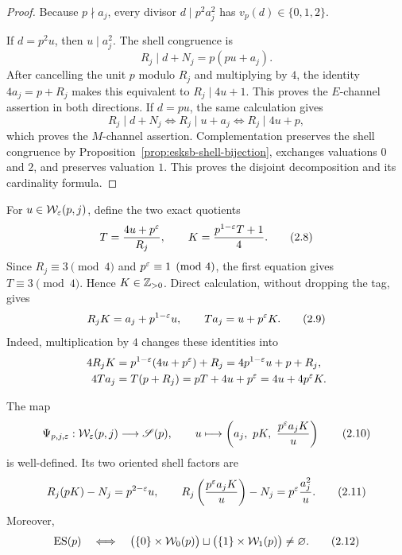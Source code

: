 \begin{proof}
Because \(p\nmid a_j\), every divisor \(d\mid p^2a_j^2\) has
\(v_p(d)\in\{0,1,2\}\).

If \(d=p^2u\), then \(u\mid a_j^2\).  The shell congruence is
\[
 R_j\mid d+N_j=p(pu+a_j).
\]
After cancelling the unit \(p\) modulo \(R_j\) and multiplying by \(4\),
the identity \(4a_j=p+R_j\) makes this equivalent to
\(R_j\mid4u+1\).  This proves the \(E\)-channel assertion in both
directions.  If \(d=pu\), the same calculation gives
\[
 R_j\mid d+N_j
 \Longleftrightarrow R_j\mid u+a_j
 \Longleftrightarrow R_j\mid4u+p,
\]
which proves the \(M\)-channel assertion.  Complementation preserves the
shell congruence by Proposition~\ref{prop:esksb-shell-bijection}, exchanges
valuations \(0\) and \(2\), and preserves valuation \(1\).  This proves the
disjoint decomposition and its cardinality formula.
\end{proof}

For \(u\in\mathcal W_\varepsilon(p,j)\), define the two exact quotients
\begin{equation}
 T=\frac{4u+p^\varepsilon}{R_j},
 \qquad K=\frac{p^{1-\varepsilon}T+1}{4}.                            \tag{2.8}
\end{equation}
Since \(R_j\equiv3\pmod4\) and \(p^\varepsilon\equiv1\pmod4\), the first equation
gives \(T\equiv3\pmod4\).  Hence \(K\in\mathbb Z_{>0}\).  Direct calculation,
without dropping the tag, gives
\begin{equation}
 R_jK=a_j+p^{1-\varepsilon}u,
 \qquad Ta_j=u+p^\varepsilon K.                                    \tag{2.9}
\end{equation}
Indeed, multiplication by \(4\) changes these identities into
\begin{align*}
 4R_jK
 &=p^{1-\varepsilon}(4u+p^\varepsilon)+R_j
 =4p^{1-\varepsilon}u+p+R_j,\\
 4Ta_j
 &=T(p+R_j)
 =pT+4u+p^\varepsilon
 =4u+4p^\varepsilon K.
\end{align*}

\begin{proposition}\label{prop:esksb-reconstruct}
The map
\begin{equation}
 \Psi_{p,j,\varepsilon}:\mathcal W_\varepsilon(p,j)\longrightarrow\mathscr S(p),
 \qquad
 u\longmapsto
 \left(a_j,\ pK,\ \frac{p^\varepsilon a_jK}{u}\right)             \tag{2.10}
\end{equation}
is well-defined.  Its two oriented shell factors are
\begin{equation}
 R_j(pK)-N_j=p^{2-\varepsilon}u,
 \qquad
 R_j\left(\frac{p^\varepsilon a_jK}{u}\right)-N_j
 =p^\varepsilon\frac{a_j^2}{u}.                                    \tag{2.11}
\end{equation}
Moreover,
\begin{equation}
 \operatorname{ES}(p)\quad\Longleftrightarrow\quad
 \bigl(\{0\}\times\mathcal W_0(p)\bigr)\sqcup
 \bigl(\{1\}\times\mathcal W_1(p)\bigr)\neq\varnothing.   \tag{2.12}
\end{equation}
\end{proposition}

